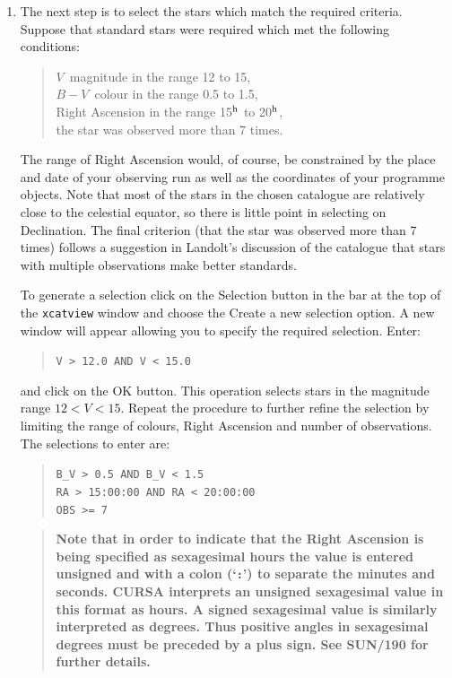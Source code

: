 \documentclass[twoside,11pt]{article}
\newcommand{\xref}[3]{#1}
\begin{document}
\begin{enumerate}
  \item The next step is to select the stars which match the required
   criteria.  Suppose that standard stars were required which met the
   following conditions:

  \begin{verse}
   $V$\, magnitude in the range 12 to 15,      \\
   $B - V$\, colour in the range 0.5 to 1.5,   \\
   Right Ascension in the range 15$^{\rm h}$ to 20$^{\rm h}$, \\
   the star was observed more than 7 times.
  \end{verse}

   The range of Right Ascension would, of course, be constrained by
   the place and date of your observing run as well as the coordinates
   of your programme objects.  Note that most of the stars in the chosen
   catalogue are relatively close to the celestial equator, so there is
   little point in selecting on Declination.  The final criterion (that
   the star was observed more than 7 times) follows a suggestion in
   Landolt's discussion of the catalogue\cite{LANDOLT92} that stars with
   multiple observations make better standards.

   To generate a selection click on the {\sf Selection} button in the
   bar at the top of the {\tt xcatview} window and choose the {\sf
   Create a new selection} option.  A new window will appear allowing
   you to specify the required selection.  Enter:

  \begin{verse}
   \verb-V > 12.0 AND V < 15.0-
  \end{verse}

   and click on the {\sf OK} button.  This operation selects stars in
   the magnitude range $12 < V < 15$.  Repeat the procedure to further
   refine the selection by limiting the range of colours, Right Ascension
   and number of observations.  The selections to enter are:

  \begin{verse}
   \verb-B_V > 0.5 AND B_V < 1.5-         \\
   \verb-RA > 15:00:00 AND RA < 20:00:00- \\
   \verb-OBS >= 7-
  \end{verse}

  \begin{quote}
   {\bf Note that in order to indicate that the Right Ascension is being
   specified as sexagesimal hours the value is entered unsigned and with
   a colon (`{\tt :}') to separate the minutes and seconds.  CURSA
   interprets an unsigned sexagesimal value in this format as hours.  A
   signed sexagesimal value is similarly interpreted as degrees.  Thus
   positive angles in sexagesimal degrees must be preceded by a plus sign.
   See \xref{SUN/190}{sun190}{}\cite{SUN190} for further details.}
  \end{quote}


\end{enumerate}
\end{document}
